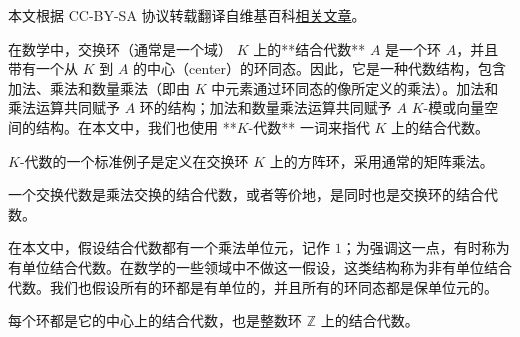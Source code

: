 
本文根据 CC-BY-SA 协议转载翻译自维基百科\href{https://en.wikipedia.org/wiki/Associative_algebra}{相关文章}。

在数学中，交换环（通常是一个域） $K$ 上的**结合代数** $A$ 是一个环 $A$，并且带有一个从 $K$ 到 $A$ 的中心（center）的环同态。因此，它是一种代数结构，包含加法、乘法和数量乘法（即由 $K$ 中元素通过环同态的像所定义的乘法）。加法和乘法运算共同赋予 $A$ 环的结构；加法和数量乘法运算共同赋予 $A$ $K$-模或向量空间的结构。在本文中，我们也使用 **$K$-代数** 一词来指代 $K$ 上的结合代数。

$K$-代数的一个标准例子是定义在交换环 $K$ 上的方阵环，采用通常的矩阵乘法。

一个交换代数是乘法交换的结合代数，或者等价地，是同时也是交换环的结合代数。

在本文中，假设结合代数都有一个乘法单位元，记作 $1$；为强调这一点，有时称为有单位结合代数。在数学的一些领域中不做这一假设，这类结构称为非有单位结合代数。我们也假设所有的环都是有单位的，并且所有的环同态都是保单位元的。

每个环都是它的中心上的结合代数，也是整数环 $\mathbb{Z}$ 上的结合代数。
